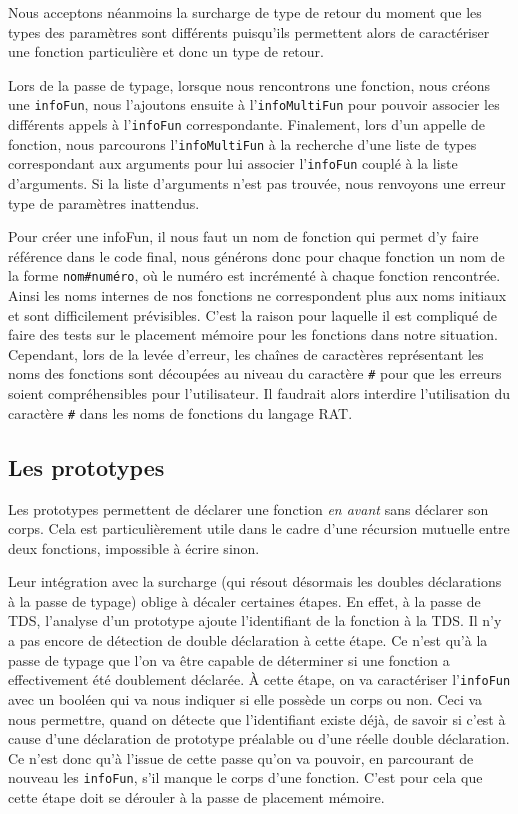 \documentclass[11pt,a4paper]{article}
\begin{document}
Nous acceptons néanmoins la surcharge de type de retour du moment que les types des paramètres sont différents puisqu'ils permettent alors de caractériser une fonction particulière et donc un type de retour.

Lors de la passe de typage, lorsque nous rencontrons une fonction, nous créons une \texttt{infoFun}, nous l'ajoutons ensuite à l'\texttt{infoMultiFun} pour pouvoir associer les différents appels à l'\texttt{infoFun} correspondante. Finalement, lors d'un appelle de fonction, nous parcourons l'\texttt{infoMultiFun} à la recherche d'une liste de types correspondant aux arguments pour lui associer l'\texttt{infoFun} couplé à la liste d'arguments. Si la liste d'arguments n'est pas trouvée, nous renvoyons une erreur type de paramètres inattendus.

Pour créer une infoFun, il nous faut un nom de fonction qui permet d'y faire référence dans le code final, nous générons donc pour chaque fonction un nom de la forme \texttt{nom\#numéro}, où le numéro est incrémenté à chaque fonction rencontrée. Ainsi les noms internes de nos fonctions ne correspondent plus aux noms initiaux et sont difficilement prévisibles. C'est la raison pour laquelle il est compliqué de faire des tests sur le placement mémoire pour les fonctions dans notre situation. Cependant, lors de la levée d'erreur, les chaînes de caractères représentant les noms des fonctions sont découpées au niveau du caractère \texttt{\#} pour que les erreurs soient compréhensibles pour l'utilisateur. Il faudrait alors interdire l'utilisation du caractère \texttt{\#} dans les noms de fonctions du langage RAT.

\subsection{Les prototypes}
\label{partiePrototypes}

Les prototypes permettent de déclarer une fonction \emph{en avant} sans déclarer son corps. Cela est particulièrement utile dans le cadre d'une récursion mutuelle entre deux fonctions, impossible à écrire sinon.

Leur intégration avec la surcharge (qui résout désormais les doubles déclarations à la passe de typage) oblige à décaler certaines étapes. En effet, à la passe de TDS, l'analyse d'un prototype ajoute l'identifiant de la fonction à la TDS. Il n'y a pas encore de détection de double déclaration à cette étape. Ce n'est qu'à la passe de typage que l'on va être capable de déterminer si une fonction a effectivement été doublement déclarée. À cette étape, on va caractériser l'\texttt{infoFun} avec un booléen qui va nous indiquer si elle possède un corps ou non. Ceci va nous permettre, quand on détecte que l'identifiant existe déjà, de savoir si c'est à cause d'une déclaration de prototype préalable ou d'une réelle double déclaration. Ce n'est donc qu'à l'issue de cette passe qu'on va pouvoir, en parcourant de nouveau les \texttt{infoFun}, s'il manque le corps d'une fonction. C'est pour cela que cette étape doit se dérouler à la passe de placement mémoire.
\end{document}
